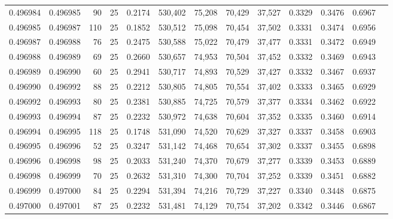 \begin{tabular}{rrrrrrrrrrrrr}
0.496984 & 0.496985 &    90 &  25 &                                     0.2174 & 530,402 &  75,208 &  70,429 &  37,527 & 0.3329 & 0.3476 & 0.6967 \\
0.496985 & 0.496987 &   110 &  25 &                                     0.1852 & 530,512 &  75,098 &  70,454 &  37,502 & 0.3331 & 0.3474 & 0.6956 \\
0.496987 & 0.496988 &    76 &  25 &                                     0.2475 & 530,588 &  75,022 &  70,479 &  37,477 & 0.3331 & 0.3472 & 0.6949 \\
0.496988 & 0.496989 &    69 &  25 &                                     0.2660 & 530,657 &  74,953 &  70,504 &  37,452 & 0.3332 & 0.3469 & 0.6943 \\
0.496989 & 0.496990 &    60 &  25 &                                     0.2941 & 530,717 &  74,893 &  70,529 &  37,427 & 0.3332 & 0.3467 & 0.6937 \\
0.496990 & 0.496992 &    88 &  25 &                                     0.2212 & 530,805 &  74,805 &  70,554 &  37,402 & 0.3333 & 0.3465 & 0.6929 \\
0.496992 & 0.496993 &    80 &  25 &                                     0.2381 & 530,885 &  74,725 &  70,579 &  37,377 & 0.3334 & 0.3462 & 0.6922 \\
0.496993 & 0.496994 &    87 &  25 &                                     0.2232 & 530,972 &  74,638 &  70,604 &  37,352 & 0.3335 & 0.3460 & 0.6914 \\
0.496994 & 0.496995 &   118 &  25 &                                     0.1748 & 531,090 &  74,520 &  70,629 &  37,327 & 0.3337 & 0.3458 & 0.6903 \\
0.496995 & 0.496996 &    52 &  25 &                                     0.3247 & 531,142 &  74,468 &  70,654 &  37,302 & 0.3337 & 0.3455 & 0.6898 \\
0.496996 & 0.496998 &    98 &  25 &                                     0.2033 & 531,240 &  74,370 &  70,679 &  37,277 & 0.3339 & 0.3453 & 0.6889 \\
0.496998 & 0.496999 &    70 &  25 &                                     0.2632 & 531,310 &  74,300 &  70,704 &  37,252 & 0.3339 & 0.3451 & 0.6882 \\
0.496999 & 0.497000 &    84 &  25 &                                     0.2294 & 531,394 &  74,216 &  70,729 &  37,227 & 0.3340 & 0.3448 & 0.6875 \\
0.497000 & 0.497001 &    87 &  25 &                                     0.2232 & 531,481 &  74,129 &  70,754 &  37,202 & 0.3342 & 0.3446 & 0.6867 \\

\end{tabular}
